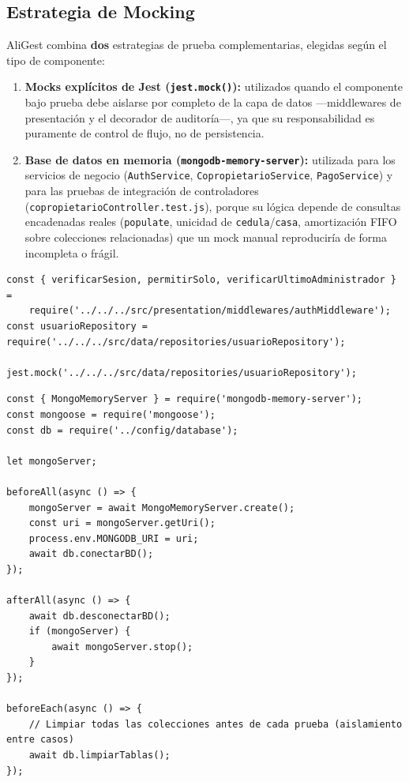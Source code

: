 \documentclass[12pt,a4paper]{article}
\begin{document}
\subsection{Estrategia de Mocking}

AliGest combina \textbf{dos} estrategias de prueba complementarias, elegidas según el
tipo de componente:

\begin{enumerate}[nosep]
    \item \textbf{Mocks explícitos de Jest (\texttt{jest.mock()}):} utilizados quando el
    componente bajo prueba debe aislarse por completo de la capa de datos —middlewares de
    presentación y el decorador de auditoría—, ya que su responsabilidad es puramente de
    control de flujo, no de persistencia.
    \item \textbf{Base de datos en memoria (\texttt{mongodb-memory-server}):} utilizada para
    los servicios de negocio (\texttt{AuthService}, \texttt{CopropietarioService},
    \texttt{PagoService}) y para las pruebas de integración de controladores
    (\texttt{copropietarioController.test.js}), porque su lógica depende de consultas
    encadenadas reales (\texttt{populate}, unicidad de \texttt{cedula}/\texttt{casa},
    amortización FIFO sobre colecciones relacionadas) que un mock manual reproduciría de
    forma incompleta o frágil.
\end{enumerate}

\begin{lstlisting}[caption={Aislamiento con \texttt{jest.mock()} en \texttt{authMiddleware.test.js}}]
const { verificarSesion, permitirSolo, verificarUltimoAdministrador } =
    require('../../../src/presentation/middlewares/authMiddleware');
const usuarioRepository = require('../../../src/data/repositories/usuarioRepository');

jest.mock('../../../src/data/repositories/usuarioRepository');
\end{lstlisting}

\begin{lstlisting}[caption={Integración real con \texttt{mongodb-memory-server} en \texttt{tests/setup.js}}]
const { MongoMemoryServer } = require('mongodb-memory-server');
const mongoose = require('mongoose');
const db = require('../config/database');

let mongoServer;

beforeAll(async () => {
    mongoServer = await MongoMemoryServer.create();
    const uri = mongoServer.getUri();
    process.env.MONGODB_URI = uri;
    await db.conectarBD();
});

afterAll(async () => {
    await db.desconectarBD();
    if (mongoServer) {
        await mongoServer.stop();
    }
});

beforeEach(async () => {
    // Limpiar todas las colecciones antes de cada prueba (aislamiento entre casos)
    await db.limpiarTablas();
});
\end{lstlisting}
\end{document}
